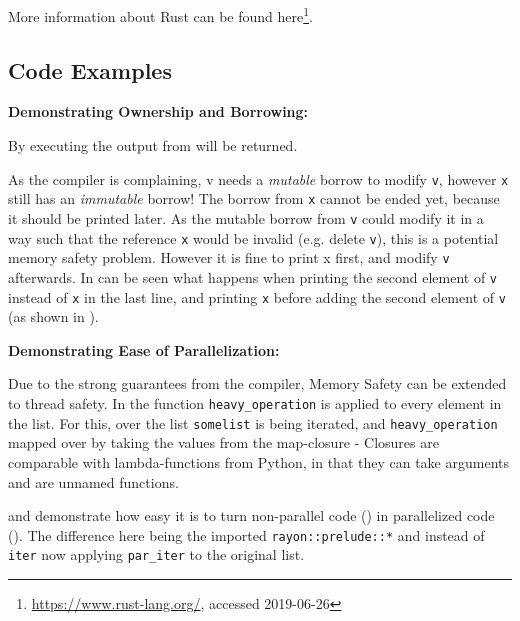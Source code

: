 More information about Rust can be found
here\footnote{\url{https://www.rust-lang.org/}, accessed 2019-06-26}.




\newpage
\subsection{Code Examples}\label{sec:examples}

\textbf{Demonstrating Ownership and Borrowing:}

By executing  the output from  will be returned.



As the compiler is complaining, v needs a {\em mutable} borrow to modify
\verb|v|, however \verb|x| still has an {\em immutable} borrow! The borrow from
\verb|x| cannot be ended yet, because it should be printed later. As the mutable
borrow from \verb|v| could modify it in a way such that the reference \verb|x|
would be invalid (e.g. delete \verb|v|), this is a potential memory safety problem.
However it is fine to print x first, and modify \verb|v| afterwards. In
 can be seen what happens when printing the second element of
\verb|v| instead of \verb|x| in the last line, and printing \verb|x| before
adding the second element of \verb|v| (as shown in ).



\newpage
\textbf{Demonstrating Ease of Parallelization:}\label{demo:par}

Due to the strong guarantees from the compiler, Memory Safety can be extended
to thread safety. In  the function \verb|heavy_operation| is
applied to every element in the list. For this, over the list \verb|somelist|
is being iterated, and \verb|heavy_operation| mapped over by taking the values
from the map-closure - Closures are comparable with lambda-functions from
Python, in that they can take arguments and are unnamed functions.

 and  demonstrate how easy it is to turn
non-parallel code () in parallelized code ().
The difference here being the imported \verb|rayon::prelude::*| and instead of
\verb|iter| now applying \verb|par_iter| to the original list.

